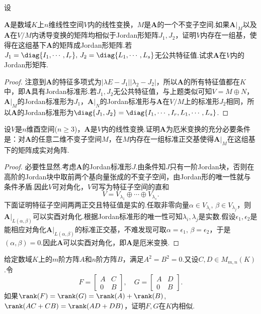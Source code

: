 \begin{prob}[11]
	\hypertarget{JordanOfQuotient}{设}$\bm A$是数域$K$上$n$维线性空间$V$内的线性变换，$M$是$\bm A$的一个不变子空间.如果$\bm A|_M$以及$\bm A$在$V/M$内诱导变换的矩阵均相似于Jordan形矩阵$J_1,J_2$，证明$V$内存在一组基，使得在这组基下$\bm A$的矩阵成Jordan形矩阵.若$J_1=\diag{I_1,\cdots,I_r},\,J_2=\diag{L_1,\cdots,L_s}$无公共特征值.试求$\bm A$在$V$内的Jordan形矩阵.
\end{prob}
\begin{proof}
	注意到$\bm A$的特征多项式为$|\lambda E-J_1||\lambda_2-J_2|$，所以$\bm A$的所有特征值都在$K$中，即$\bm A$具有Jordan标准形.若$J_1,J_2$无公共特征值，与上题类似可知$V=M\oplus N$，$\bm A|_M$的Jordan标准形为$J_1$，$\bm A|_N$的Jordan标准形与$\bm A$在$V/M$上的标准形$J_2$相同，所以$\bm A$的Jordan标准形为$\diag{J_1,J_2}=\diag{I_1,\cdots,I_r,L_1,\cdots,L_s}$.
\end{proof}
\begin{prob}[12]
	设$V$是$n$维酉空间($n\ge 3$)，$\bm A$是$V$内的线性变换.证明$\bm A$为厄米变换的充分必要条件是：对$\bm A$的任意二维不变子空间$M$，在$M$内存在一组标准正交基使得$\bm A|_M$在这组基下的矩阵成实对角阵.
\end{prob}
\begin{proof}
	必要性显然.考虑$\bm A$的Jordan标准形$J$.由条件知$J$只有一阶Jordan块，否则在高阶的Jordan块中取前两个基向量张成的不变子空间，由Jordan形的唯一性就与条件矛盾.因此$V$可对角化，$V$可写为特征子空间的直和
	\[
		V=V_{\lambda_1}\oplus\cdots\oplus V_{\lambda_s}.
	\]
	下面证明特征子空间两两正交且特征值是实的.任取非零向量$\alpha\in V_{\lambda_i},\,\beta\in V_{\lambda_j}$，则$\bm A|_{L(\alpha,\beta)}$可以实酉对角化.根据Jordan标准形的唯一性可知$\lambda_i,\lambda_j$是实数.假设$\epsilon_1,\epsilon_2$是能相应对角化$\bm A|_{L(\alpha,\beta)}$的标准正交基，不难发现可取$\alpha=\epsilon_1,\,\beta=\epsilon_2$，于是$(\alpha,\beta)=0$.因此$\bm A$可以实酉对角化，即$\bm A$是厄米变换.
\end{proof}
\begin{prob}[13]
	给定数域$K$上的$m$阶方阵$A$和$n$阶方阵$B$，满足$A^2=B^2=0$.又设$C,D\in M_{m,n}(K)$.令
	\[
		F=\begin{bmatrix}
			A & C \\
			0 & B
		\end{bmatrix},\quad G=\begin{bmatrix}
			A & D \\
			0 & B
		\end{bmatrix}.
	\]
	如果$\rank(F)=\rank(G)=\rank(A)+\rank(B)$,$\rank(AC+CB)=\rank(AD+DB)$，证明$F,G$在$K$内相似.
\end{prob}

